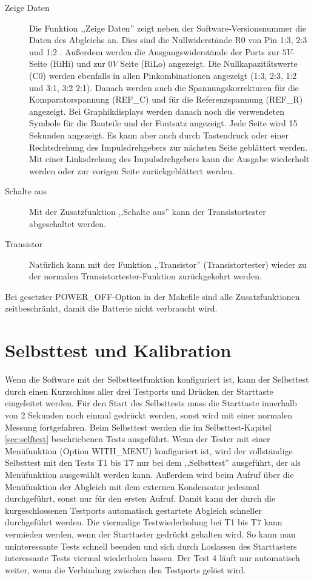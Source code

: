 \begin{description}
 \item[Zeige Daten]
Die Funktion ,,Zeige Daten'' zeigt neben der Software-Versionsnummer die Daten des Abgleichs an.
Dies sind die Nullwiderstände R0 von Pin 1:3, 2:3 und 1:2 .
Außerdem werden die Ausgangswiderstände der Ports zur \(5V\)-Seite (RiHi) und 
zur \(0V\) Seite (RiLo) angezeigt.
Die Nullkapazitätswerte (C0) werden ebenfalls in allen Pinkombinationen angezeigt (1:3, 2:3, 1:2 und 3:1, 3:2 2:1).
Danach werden auch die Spannungskorrekturen für die Komparatorspannung (REF\_C) und für die Referenzspannung (REF\_R) angezeigt.
Bei Graphikdisplays werden danach noch die verwendeten Symbole für die Bauteile und der Fontsatz angezeigt.
Jede Seite wird 15 Sekunden angezeigt.
Es kann aber auch durch Tastendruck oder einer Rechtsdrehung des Impulsdrehgebers
zur nächsten Seite geblättert werden.
Mit einer Linksdrehung des Impulsdrehgebers kann die Ausgabe wiederholt werden oder zur vorigen Seite zurückgeblättert werden.

 \item[Schalte aus]
Mit der Zusatzfunktion ,,Schalte aus'' kann der Transistortester abgeschaltet werden.\\

 \item[Transistor]
Natürlich kann mit der Funktion ,,Transistor'' (Transistortester) wieder zu der normalen Transistortester-Funktion
zurückgekehrt werden.

\end{description}

Bei gesetzter POWER\_OFF-Option in der Makefile sind alle Zusatzfunktionen zeitbeschränkt, damit die Batterie nicht verbraucht wird.

\section{Selbsttest und Kalibration}

Wenn die Software mit der Selbsttestfunktion konfiguriert ist, kann der Selbsttest durch einen Kurzschluss aller drei
Testports und Drücken der Starttaste eingeleitet werden.
Für den Start des Selbsttests muss die Starttaste innerhalb von 2 Sekunden noch einmal gedrückt werden,
sonst wird mit einer normalen Messung fortgefahren.
Beim Selbsttest werden die im Selbsttest-Kapitel \ref{sec:selftest} beschriebenen Tests ausgeführt.
Wenn der Tester mit einer Menüfunktion (Option WITH\_MENU) konfiguriert ist, 
wird der vollständige Selbsttest mit den Tests T1 bis T7 nur bei dem ,,Selbsttest'' ausgeführt, 
der als Menüfunktion ausgewählt werden kann.
Außerdem wird beim Aufruf über die Menüfunktion der Abgleich mit dem externen Kondensator jedesmal durchgeführt,
sonst nur für den ersten Aufruf.
Damit kann der durch die kurgeschlossenen Testports automatisch gestartete Abgleich schneller durchgeführt werden. 
Die viermalige Testwiederholung bei T1 bis T7 kann vermieden werden, wenn der Starttaster gedrückt gehalten wird.
So kann man uninteressante Tests schnell beenden und
sich durch Loslassen des Starttasters interessante Tests viermal wiederholen lassen.
Der Test 4 läuft nur automatisch weiter, wenn die Verbindung zwischen den Testports gelöst wird.

